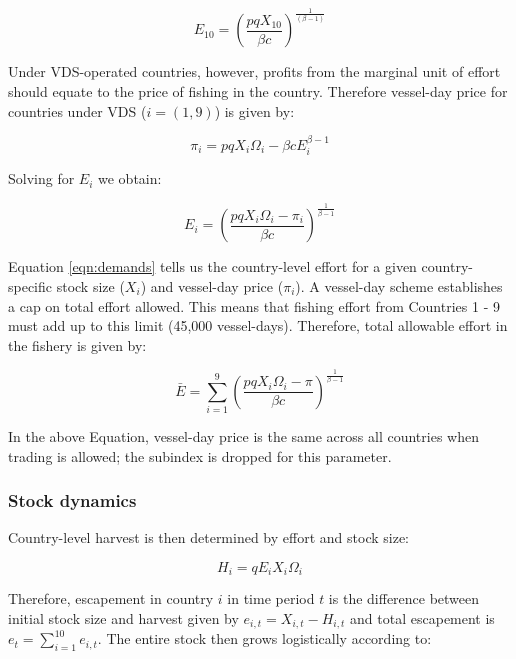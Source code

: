 \documentclass[12pt]{article}
\begin{document}
\begin{equation}
E_{10} = \left(\frac{pqX_{10}}{\beta c}\right)^{\frac{1}{(\beta - 1)}}
\label{eqn:effort_hs}
\end{equation}

Under VDS-operated countries, however, profits from the marginal unit of effort should equate to the price of fishing in the country. Therefore vessel-day price for countries under VDS ($i = (1, 9)$) is  given by:

$$
\pi_i = pqX_i\Omega_i - \beta c E_i ^{\beta - 1}
$$

\noindent Solving for $E_i$ we obtain:

\begin{equation}
E_i = \left(\frac{pqX_i\Omega_i - \pi_i}{\beta c }\right) ^ {\frac{1}{\beta - 1}}
\label{eqn:demands}
\end{equation}

Equation \ref{eqn:demands} tells us the country-level effort for a given country-specific stock size ($X_i$) and vessel-day price ($\pi_i$). A vessel-day scheme establishes a cap on total effort allowed. This means that fishing effort from Countries 1 - 9 must add up to this limit (45,000 vessel-days). Therefore, total allowable effort in the fishery is given by:

\begin{equation}
\bar{E} = \sum_{i = 1}^9\left(\frac{pqX_i\Omega_i - \pi}{\beta c }\right) ^ {\frac{1}{\beta - 1}}
\label{eqn:Ebar}
\end{equation}

\noindent In the above Equation, vessel-day price is the same across all countries when trading is allowed; the subindex is dropped for this parameter.

\subsubsection{Stock dynamics}

Country-level harvest is then determined by effort and stock size:

\begin{equation}
H_i = qE_iX_i\Omega_i
\label{eqn:harvest}
\end{equation}


\noindent Therefore, escapement in country $i$ in time period $t$ is the difference between initial stock size and harvest given by $e_{i,t} = X_{i,t} - H_{i,t}$ and total escapement is $e_t=\sum_{i=1}^{10}e_{i,t}$. The entire stock then grows logistically according to:
\end{document}
